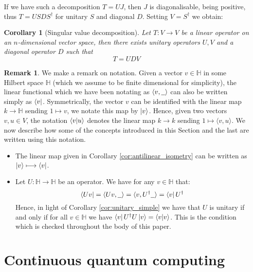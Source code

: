 \documentclass[12pt]{article}
\theoremstyle{plain}
\newtheorem{cor}[thm]{Corollary}
\theoremstyle{definition}
\newtheorem{remark}[thm]{Remark}
\newcommand{\bb}[1]{\mathbb{#1}}
\newcommand{\und}[1]{\underline{\hspace{#1 cm}}}
\newcommand{\lto}{\longrightarrow}
\begin{document}
If we have such a decomposition $T = UJ$, then $J$ is diagonalisable, being positive, thus $T = USDS^\dagger$ for unitary $S$ and diagonal $D$. Setting $V = S^\dagger$ we obtain:
\begin{cor}[Singular value decomposition]
	Let $T: V \lto V$ be a linear operator on an $n$-dimensional vector space, then there exists unitary operators $U,V$ and a diagonal operator $D$ such that
	\begin{equation}
		T = UDV
	\end{equation}
\end{cor}

\begin{remark}\label{rmk:notation_bra_ket}
	We make a remark on notation. Given a vector $v \in \bb{H}$ in some Hilbert space $\bb{H}$ (which we assume to be finite dimensional for simplicity), the linear functional which we have been notating as $\langle v, \und{0.2}\rangle$ can also be written simply as $\bra{v}$. Symmetrically, the vector $v$ can be identified with the linear map $k \lto \bb{H}$ sending $1 \longmapsto v$, we notate this map by $\ket{v}$. Hence, given two vectors $v,u \in V$, the notation $\bra{v}\ket{u}$ denotes the linear map $k \lto k$ sending $1 \longmapsto \langle v, u \rangle$. We now describe how some of the concepts introduced in this Section and the last are written using this notation.
	\begin{itemize}
		\item The linear map given in Corollary \ref{cor:antilinear_isometry} can be written as $\ket{v} \longmapsto \bra{v}$.
		\item Let $U: \bb{H} \lto \bb{H}$ be an operator. We have for any $v \in \bb{H}$ that:
		\begin{equation}
			\bra{ Uv} = \langle Uv, \und{0.2}\rangle = \langle v, U^\dagger \und{0.2}\rangle = \bra{v}U^\dagger
		\end{equation}
		Hence, in light of Corollary \ref{cor:unitary_simple} we have that $U$ is unitary if and only if for all $v \in \bb{H}$ we have $\bra{v}U^\dagger U \ket{v} = \bra{v}\ket{v}$. This is the condition which is checked throughout the body of this paper.
	\end{itemize}
\end{remark}

\section{Continuous quantum computing}\label{Sec:Math_defs}
\end{document}
